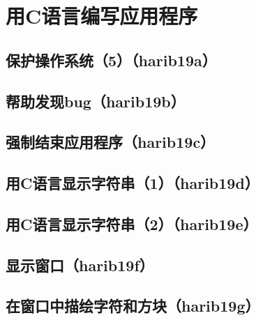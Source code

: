 ﻿\chapter{	用C语言编写应用程序	}
\section{	保护操作系统（5）（harib19a）	}
\section{	帮助发现bug（harib19b）	}
\section{	强制结束应用程序（harib19c）	}
\section{	用C语言显示字符串（1）（harib19d）	}
\section{	用C语言显示字符串（2）（harib19e）	}
\section{	显示窗口（harib19f）	}
\section{	在窗口中描绘字符和方块（harib19g）	}

